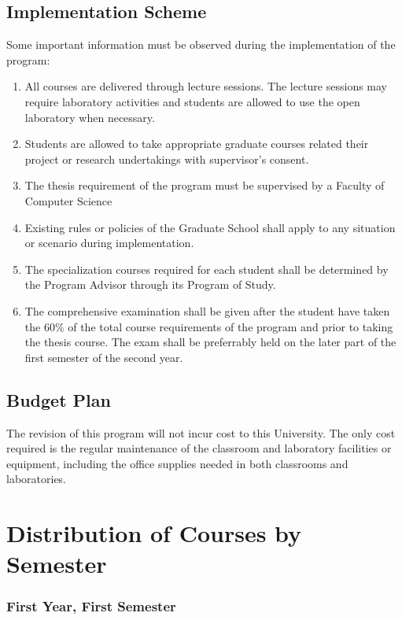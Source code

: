 \documentclass[11pt,a4paper]{article}
\begin{document}
\subsection{Implementation Scheme}

Some important information must be observed during the implementation of the program:

\begin{enumerate}
\item All courses are delivered through lecture sessions. The lecture sessions may require laboratory activities and students are allowed to use the open laboratory when necessary.
\item Students are allowed to take appropriate graduate courses related their project or research undertakings with supervisor's consent.
\item The thesis requirement of the program must be supervised by a Faculty of Computer Science
\item Existing rules or policies of the Graduate School shall apply to any situation or scenario during implementation.
\item The specialization courses required for each student shall be determined by the Program Advisor through its Program of Study.
\item The comprehensive examination shall be given after the student have taken the 60\% of the total course requirements of the program and prior to taking the thesis course. The exam shall be preferrably held on the later part of the first semester of the second year.
\end{enumerate}

\subsection{Budget Plan}

The revision of this program will not incur cost to this University. The only cost required is the regular maintenance of the classroom and laboratory facilities or equipment, including the office supplies needed in both classrooms and laboratories.

\newpage
\section{Distribution of Courses by Semester}

\subsubsection*{First Year, First Semester}
\end{document}

